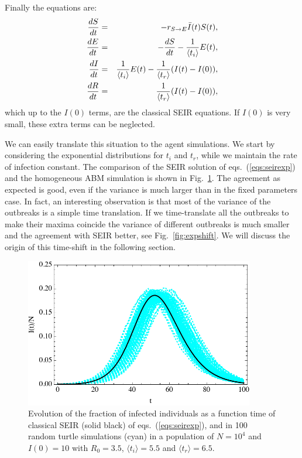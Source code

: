 \documentclass[a4paper,oneside,11pt]{article}
\begin{document}
Finally the equations are:
\begin{eqnarray}
{d S\over dt} &=& - r_{S\rightarrow E} \bar{I}(t) S(t),\nonumber\\
{d E\over dt} &=& -{d S\over d t} -{1 \over \langle t_i\rangle} E(t) ,\nonumber\\
{d I\over dt} &=& {1 \over \langle t_i\rangle} E(t) - {1\over  \langle t_r \rangle} (I(t) -I(0)),\nonumber\\
{d R\over d t} &=&  {1\over  \langle t_r\rangle} (I(t)-I(0)),\nonumber\\
\label{eqs:seirexp}
\end{eqnarray}
which up to the $I(0)$ terms, are the classical SEIR equations. If $I(0)$ is very small, these extra terms can  be neglected.

We can easily translate this situation to the agent simulations.
We start by considering the exponential distributions for $t_i$ and $t_r$, while we maintain the rate of infection constant. The comparison of the SEIR solution of eqs.~(\ref{eqs:seirexp}) and the homogeneous ABM simulation is shown in Fig.~\ref{fig:exp}. The agreement as expected is good, even if the variance is much larger than in the fixed parameters case. In fact, an interesting observation is that most of the variance 
of the outbreaks is a simple time translation. If we time-translate all the outbreaks to make their maxima coincide the variance of different outbreaks is much smaller and the agreement with SEIR better, see Fig.~\ref{fig:expshift}. We will discuss the origin of this time-shift in the following section. 
\begin{figure}[h!]
  \centering
  \includegraphics[width=10cm]{exp.pdf}
  \caption{ Evolution of the fraction of infected individuals as a function time of classical SEIR (solid black) of eqs.~(\ref{eqs:seirexp}), and in 100 random turtle simulations (cyan) in a  population of $N=10^4$ and $I(0)=10$ with $R_0=3.5$, $\langle t_i\rangle=5.5$ and $\langle t_r\rangle=6.5$.  }
  \label{fig:exp}
   \end{figure}
   
\end{document}
